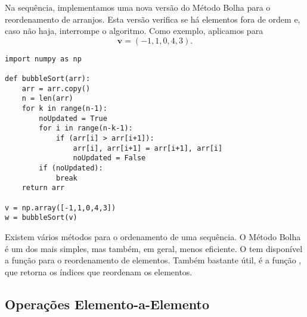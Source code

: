 \begin{ex}
  Na sequência, implementamos uma nova versão do Método Bolha para o reordenamento de arranjos. Esta versão verifica se há elementos fora de ordem e, caso não haja, interrompe o algoritmo. Como exemplo, aplicamos para
  \begin{equation}
    \pmb{v} = (-1, 1, 0, 4, 3).
  \end{equation}
  
\begin{lstlisting}[caption=bubbleSort\_v2.py]
import numpy as np

def bubbleSort(arr):
    arr = arr.copy()
    n = len(arr)
    for k in range(n-1):
        noUpdated = True
        for i in range(n-k-1):
            if (arr[i] > arr[i+1]):
                arr[i], arr[i+1] = arr[i+1], arr[i]
                noUpdated = False
        if (noUpdated):
            break
    return arr

v = np.array([-1,1,0,4,3])
w = bubbleSort(v)
\end{lstlisting}

\end{ex}

\begin{obs}
  Existem vários métodos para o ordenamento de uma sequência. O Método Bolha é um dos mais simples, mas também, em geral, menos eficiente. O {\numpy} tem disponível a função {\PYTHONnumpyDOTsort} para o reordenamento de elementos. Também bastante útil, é a função {\PYTHONnumpyDOTargsort}, que retorna os índices que reordenam os elementos.
\end{obs}

\subsection{Operações Elemento-a-Elemento}

